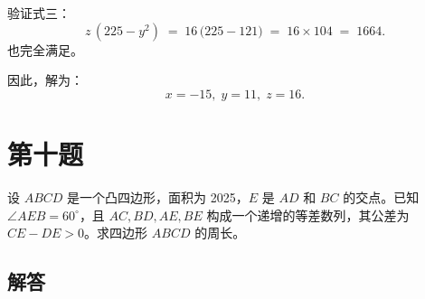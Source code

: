 \documentclass[12pt, a4paper]{article}
\theoremstyle{definition}
\theoremstyle{remark}
\begin{document}
\noindent 验证式三：
$$
z\,(225 - y^2) \;=\; 16\,\bigl(225 - 121\bigr)
\;=\; 16 \times 104
\;=\; 1664.
$$
也完全满足。

\noindent 因此，解为：
$$
x = -15, \; y = 11, \; z = 16.
$$

\newpage

\section{第十题}

\noindent 设 $ABCD$ 是一个凸四边形，面积为 2025，$E$ 是 $AD$ 和 $BC$ 的交点。已知 $\angle AEB = 60^\circ$，且 $AC, BD, AE, BE$ 构成一个递增的等差数列，其公差为 $CE - DE > 0$。求四边形 $ABCD$ 的周长。



\subsection{解答}


\newpage
\end{document}

